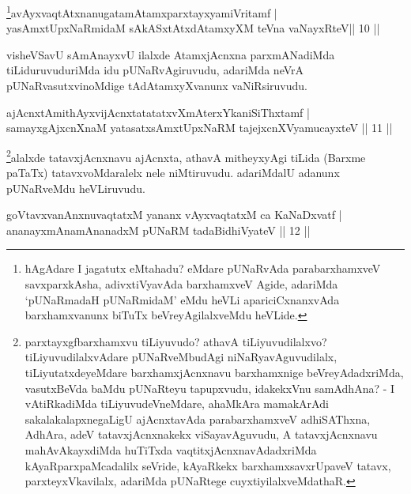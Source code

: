 \begin{shl}
\footnote{hAgAdare I jagatutx eMtahadu? eMdare pUNaRvAda parabarxhamxveV savxparxkAsha, adivxtiVyavAda barxhamxveV Agide, adariMda `pUNaRmadaH pUNaRmidaM' eMdu heVLi apariciCxnanxvAda barxhamxvanunx biTuTx beVreyAgilalxveMdu heVLide.}avAyxvaqtAtxnanugatamAtamxparxtayxyamiVritamf  | \\
yasAmxtUpxNaRmidaM sAkASxtAtxdAtamxyXM teVna vaNayxRteV\hfill ||  10 ||  
\end{shl}

\begin{artha}
visheVSavU sAmAnayxvU ilalxde AtamxjAcnxna parxmANadiMda tiLiduruvuduriMda idu pUNaRvAgiruvudu, adariMda neVrA pUNaRvasutxvinoMdige tAdAtamxyXvanunx vaNiRsiruvudu.
\end{artha}

\begin{shl}
ajAcnxtAmithAyxvijAcnxtatatatxvXmAterxYkaniSiThxtamf  | \\
samayxgAjxcnXnaM yatasatxsAmxtUpxNaRM tajejxcnXVyamucayxteV \hfill||  11 ||  
\end{shl}


\begin{artha}
\footnote{parxtayxgfbarxhamxvu tiLiyuvudo? athavA tiLiyuvudilalxvo? tiLiyuvudilalxvAdare pUNaRveMbudAgi niNaRyavAguvudilalx, tiLiyutatxdeyeMdare barxhamxjAcnxnavu barxhamxnige beVreyAdadxriMda, vasutxBeVda baMdu pUNaRteyu tapupxvudu, idakekxVnu  samAdhAna? - I vAtiRkadiMda tiLiyuvudeVneMdare, ahaMkAra mamakArAdi sakalakalapxnegaLigU ajAcnxtavAda parabarxhamxveV adhiSAThxna, AdhAra, adeV tatavxjAcnxnakekx viSayavAguvudu, A tatavxjAcnxnavu mahAvAkayxdiMda huTiTxda vaqtitxjAcnxnavAdadxriMda kAyaRparxpaMcadalilx seVride, kAyaRkekx barxhamxsavxrUpaveV tatavx, parxteyxVkavilalx, adariMda pUNaRtege cuyxtiyilalxveMdathaR.}alalxde tatavxjAcnxnavu ajAcnxta, athavA mitheyxyAgi tiLida (Barxme paTaTx) tatavxvoMdaralelx nele niMtiruvudu. adariMdalU adanunx pUNaRveMdu heVLiruvudu.
\end{artha}


\begin{shl}
goVtavxvanAnxnuvaqtatxM yananx vAyxvaqtatxM ca KaNaDxvatf  | \\
ananayxmAnamAnanadxM  pUNaRM tadaBidhiVyateV \hfill||  12 ||  
\end{shl}


